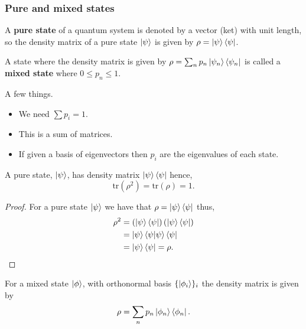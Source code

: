 \documentclass[12pt, a4paper]{article}
\begin{document}
\subsubsection{Pure and mixed states}

\begin{definition}
    A \textbf{pure state} of a quantum system is denoted by a vector (ket) with unit length, so the density matrix of a pure state \(\ket{\psi}\) is given by \(\rho= \ket{\psi}\bra{\psi}\).
\end{definition}

\begin{definition}
    A state where the density matrix is given by \(\rho = \sum_n p_n \ket{\psi_n}\bra{\psi_n}\) is called a \textbf{mixed state} where \(0\leq p_n \leq 1\).
\end{definition}

\begin{mdnote}
    A few things.
    \begin{itemize}
        \item We need \(\sum p_i =1\).
        \item This is a sum of matrices.
        \item If given a basis of eigenvectors then \(p_i\) are the eigenvalues of each state.
    \end{itemize}
\end{mdnote}

\begin{theorem}
    A pure state, \(\ket{\psi}\), has density matrix \(\ket{\psi}\bra{\psi}\) hence,
    \[\text{tr}(\rho^2)=\text{tr}(\rho)=1.\]
\end{theorem}

\begin{proof}
    For a pure state \(\ket{\psi}\) we have that \(\rho=\ket{\psi}\bra{\psi}\) thus, 
    \[\begin{aligned}
        \rho^2 &= \left( \ket{\psi}\bra{\psi} \right) \left( \ket{\psi}\bra{\psi} \right) \\
        &=\ket{\psi}\bra{\psi}\ket{\psi}\bra{\psi} \\
        &= \ket{\psi}\bra{\psi} = \rho.
    \end{aligned}\]
\end{proof}

\begin{mdprop}
    For a mixed state \(\ket{\phi}\), with orthonormal basis \(\{\ket{\phi_i}\}_i\) the density matrix is given by 
    \[\rho = \sum_n p_n \ket{\phi_n} \bra{\phi_n}.\]
\end{mdprop}
\end{document}
